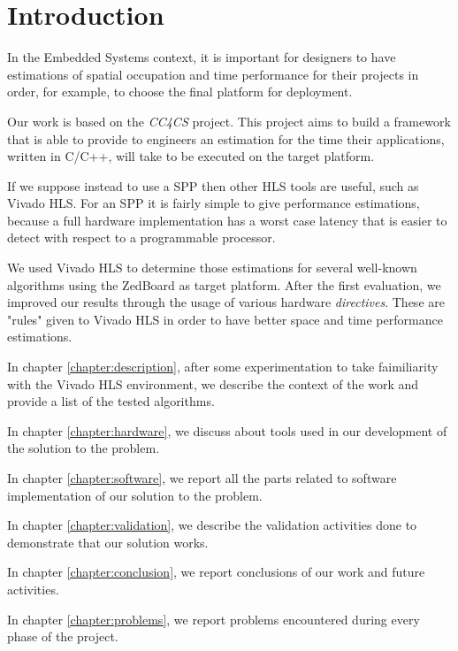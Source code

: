 \chapter*{Introduction}

In the Embedded Systems context, it is important for designers to have estimations of spatial occupation and time performance for their projects in order, for example, to choose the final platform for deployment.

Our work is based on the \textit{CC4CS} project\cite{cc4cs_git}. This project aims to build a framework that is able to provide to engineers an estimation for the time their applications, written in C/C++, will take to be executed on the target platform.

If we suppose instead to use a SPP then other HLS tools are useful, such as Vivado HLS\cite{vivado_hls}. For an SPP it is fairly simple to give performance estimations, because a full hardware implementation has a worst case latency that is easier to detect with respect to a programmable processor.

We used Vivado HLS to determine those estimations for several well-known algorithms using the ZedBoard as target platform\cite{zedboard}. After the first evaluation, we improved our results through the usage of various hardware \emph{directives}. These are "rules" given to Vivado HLS in order to have better space and time performance estimations.

In chapter \ref{chapter:description}, after some experimentation to take faimiliarity with the Vivado HLS environment, we describe the context of the work and provide a list of the tested algorithms.

In chapter \ref{chapter:hardware}, we discuss about tools used in our development of the solution to the problem.

In chapter \ref{chapter:software}, we report all the parts related to software implementation of our solution to the problem.

In chapter \ref{chapter:validation}, we describe the validation activities done to demonstrate that our solution works.

In chapter \ref{chapter:conclusion}, we report conclusions of our work and future activities.

In chapter \ref{chapter:problems}, we report problems encountered during every phase of the project.